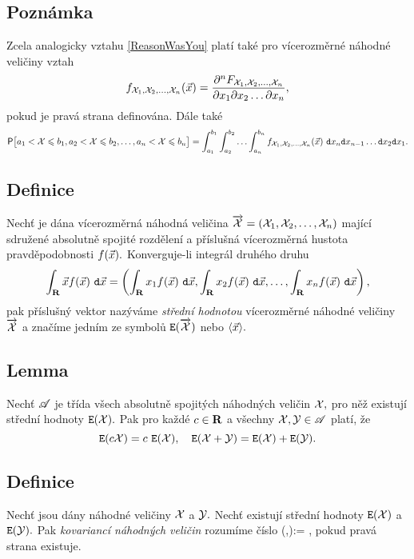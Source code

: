 \subsection{Poznámka}

Zcela analogicky vztahu \eqref{ReasonWasYou} plat\'i tak\'e pro v\'icerozm\v ern\'e n\'ahodn\'e veli\v ciny vztah
%
$$f_{{\mathcal X}_1,{\mathcal X}_2,\ldots,{\mathcal X}_n}({\vec{x}})= \frac{\partial^n F_{{\mathcal X}_1,{\mathcal X}_2,\ldots,{\mathcal X}_n}}{\partial x_1\partial x_2 \ldots \partial x_n},$$
%
pokud je prav\'a strana definov\'ana. D\'ale tak\'e
%
$$\mbox{\sf P}\bigl[a_1< {\mathcal X} \leqslant b_1,a_2< {\mathcal X} \leqslant b_2,\ldots,a_n< {\mathcal X} \leqslant b_n\bigr]=\int_{a_1}^{b_1}\int_{a_2}^{b_2}\ldots\int_{a_n}^{b_n} f_{{\mathcal X}_1,{\mathcal X}_2,\ldots,{\mathcal X}_n}({\vec{x}})~\mathtt{d}x_n\mathtt{d}x_{n-1}\ldots \mathtt{d}x_2\mathtt{d}x_1.$$

\subsection{Definice}\label{rare}
Nech\v t je d\'ana v\'icerozm\v ern\'a n\'ahodn\'a veli\v cina $\overrightarrow{{\mathcal X}}=({\mathcal X}_1,{\mathcal X}_2,\ldots,{\mathcal X}_n)$ maj\'ic\'i sdru\v zen\'e absolutn\v e spojit\'e rozd\v elen\'i a p\v r\'islu\v sn\'a v\'icerozm\v ern\'a hustota pravd\v
epodobnosti $f({\vec{x}}).$ Konverguje-li integr\'al druh\'eho druhu
$$\int_{{\mathbf R}} {\vec{x}} f({\vec{x}})~\mathtt{d}{\vec{x}}=\left(\int_{{\mathbf R}} x_1 f({\vec{x}})~\mathtt{d}{\vec{x}},\int_{{\mathbf R}} x_2 f({\vec{x}})~\mathtt{d}{\vec{x}},\ldots,\int_{{\mathbf R}} x_n f({\vec{x}})~\mathtt{d}{\vec{x}}\right),$$ pak p\v r\'islu\v
sn\'y vektor naz\'yv\'ame \emph{střední hodnotou} v\'icerozm\v
ern\'e n\'ahodn\'e veli\v ciny $\overrightarrow{{\mathcal X}}$ a zna\v c\'ime jedn\'im ze
symbol\r u $\mathtt{E}(\overrightarrow{{\mathcal X}})$ nebo $\langle {\vec{x}} \rangle.$

\subsection{Lemma}\label{you}

Nech\v t ${\mathscr A}$ je t\v r\'ida v\v sech absolutn\v e spojit\'ych n\'ahodn\'ych veli\v cin ${\mathcal X},$ pro n\v e\v z existuj\'i st\v redn\'i hodnoty $\mathtt{E}({\mathcal X}).$ Pak pro ka\v zd\'e $c\in{\mathbf R}$ a v\v sechny ${\mathcal X},{\mathcal Y}\in{\mathscr A}$ plat\'i, \v ze
%
$$\mathtt{E}(c{\mathcal X})=c~\mathtt{E}({\mathcal X}), \quad \mathtt{E}({\mathcal X}+{\mathcal Y})=\mathtt{E}({\mathcal X})+\mathtt{E}({\mathcal Y}).$$

\subsection{Definice}

Nech\v t jsou d\'any n\'ahodn\'e veli\v ciny ${\mathcal X}$ a ${\mathcal Y}.$ Nech\v t existuj\'i st\v redn\'i hodnoty $\mathtt{E}({\mathcal X})$ a $\mathtt{E}({\mathcal Y}).$ Pak \emph{kovarianc\'i n\'ahodn\'ych veli\v cin} rozum\'ime \v c\'islo
%
\BE \COV(\X,\Y):= \EV \Bigl[\bigl(\X-\EV(\X)\bigr)\bigl(\Y-\EV(\Y)\bigr)\Bigr],\label{spirit}\EE
%
pokud prav\'a strana existuje.

